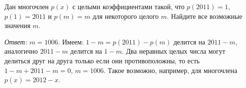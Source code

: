\problem
Дан многочлен $p(x)$ с целыми коэффициентами такой, что
$p(2011) = 1$, $p(1) = 2011$ и $p(m) = m$ для некоторого целого $m$.
Найдите все возможные значения $m$.


\solution
\emph{Ответ:} $m = 1006$.
Имеем: $1 - m = p(2011) - p(m)$ делится на $2011 - m$, аналогично $2011 - m$
делится на $1 - m$.
Два неравных целых числа могут делиться друг на друга только если они
противоположны, то есть $1 - m + 2011 - m = 0$, $m = 1006$.
Такое возможно, например, для многочлена $p(x) = 2012 - x$.

\endproblem
